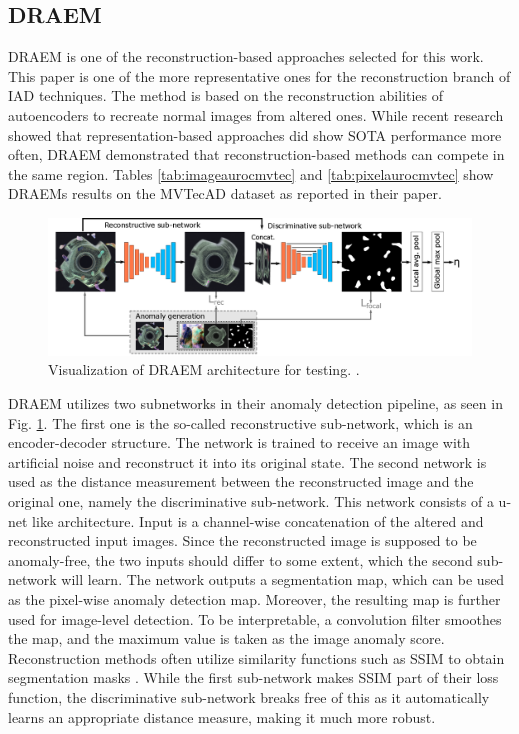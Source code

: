 \subsection{DRAEM}
\label{subsec:DRAEM}

DRAEM \cite{Zavrtanik_2021DRAEM} is one of the reconstruction-based approaches selected for this work. This paper is one of the more representative ones for the reconstruction branch of 
IAD techniques. The method is based on the reconstruction abilities of autoencoders to recreate normal images from altered ones. While recent research showed that representation-based approaches did 
show SOTA performance more often, DRAEM demonstrated that reconstruction-based methods can compete in the same region. Tables \ref{tab:imageaurocmvtec} and 
\ref{tab:pixelaurocmvtec} show DRAEMs results on the MVTecAD dataset as reported 
in their paper.\newline

\begin{figure}[H]
 \centering
\includegraphics[width=\textwidth]{figures/DRAEM_pipeline.png}
 \caption{Visualization of DRAEM architecture for testing. \cite{Zavrtanik_2021DRAEM}.}
 \label{fig:draempipeline}
\end{figure}

DRAEM utilizes two subnetworks in their anomaly detection pipeline, as seen in Fig. \ref{fig:draempipeline}. The first one is the so-called reconstructive sub-network, which is an encoder-decoder structure. The network is trained 
to receive an image with artificial noise and reconstruct it into its original state. The second network is used as the distance measurement between the reconstructed image and the original one, 
namely the discriminative sub-network. This network consists of a u-net \cite{Ronneberger_2015UNET} like architecture. Input is a channel-wise concatenation of the altered and reconstructed 
input images. Since the reconstructed image is supposed to be anomaly-free, the two inputs should differ to some extent, which the second sub-network will learn. The network outputs a segmentation map, 
which can be used as the pixel-wise anomaly detection map. Moreover, the resulting map is further used for image-level detection. To be interpretable, a convolution filter smoothes the map, and the maximum value is taken as the image anomaly score. Reconstruction methods often utilize similarity functions such as SSIM \cite{Wang_2004SSIM} to obtain segmentation masks \cite{Zavrtanik_2021DRAEM} 
\cite{liu2024deep}. While the first 
sub-network makes SSIM part of their loss function, the discriminative sub-network breaks free of this as it automatically learns an appropriate distance measure, making it much more robust.

